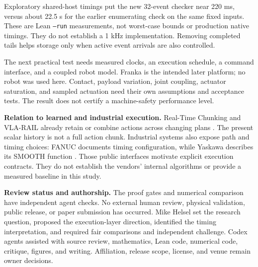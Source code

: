 \documentclass[10pt,letterpaper]{article}
\begin{document}
Exploratory shared-host timings put the new 32-event checker near 220 ms,
versus about 22.5 s for the earlier enumerating check on the same fixed inputs.
These are Lean \texttt{--run} measurements, not worst-case bounds or production
native timings. They do not establish a 1 kHz implementation. Removing completed
tails helps storage only when active event arrivals are also controlled.

The next practical test needs measured clocks, an execution schedule, a command
interface, and a coupled robot model. Franka is the intended later platform;
no robot was used here. Contact, payload variation, joint coupling, actuator
saturation, and sampled actuation need their own assumptions and acceptance
tests. The result does not certify a machine-safety performance level.

\textbf{Relation to learned and industrial execution.}
Real-Time Chunking and VLA-RAIL already retain or combine actions across changing
plans \cite{rtc,rail}. The present scalar history is not a full action chunk.
Industrial systems also expose path and timing choices: FANUC documents timing
configuration, while Yaskawa describes its SMOOTH function \cite{fanuc,yaskawa}. Those public interfaces
motivate explicit execution contracts. They do not establish the vendors'
internal algorithms or provide a measured baseline in this study.

\textbf{Review status and authorship.}
The proof gates and numerical comparison have independent agent checks.
No external human review, physical validation, public release, or paper
submission has occurred. Mike Helsel set the research question, proposed the
execution-layer direction, identified the timing interpretation, and required
fair comparisons and independent challenge. Codex agents assisted with source
review, mathematics, Lean code, numerical code, critique, figures, and writing.
Affiliation, release scope, license, and venue remain owner decisions.
\end{document}
